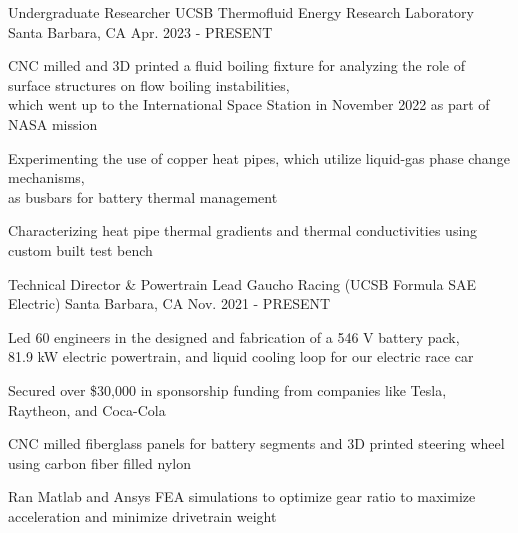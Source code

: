 

\begin{cventries}

\cventry
{Undergraduate Researcher} %
{UCSB Thermofluid Energy Research Laboratory} %
{Santa Barbara, CA} %
{Apr. 2023 - PRESENT} %
{ %
\begin{cvitems}   
\item {CNC milled and 3D printed a fluid boiling fixture for analyzing the role of surface structures on flow boiling instabilities,\\ which went up to the International Space Station in November 2022 as part of NASA mission}
\item {Experimenting the use of copper heat pipes, which utilize liquid-gas phase change mechanisms,\\ as busbars for battery thermal management}
\item {Characterizing heat pipe thermal gradients and thermal conductivities using custom built test bench}
\end{cvitems}
}

\cventry
{Technical Director \& Powertrain Lead} %
{Gaucho Racing (UCSB Formula SAE Electric)} %
{Santa Barbara, CA} %
{Nov. 2021 - PRESENT} %
{ %
\begin{cvitems}   
\item {Led 60 engineers in the designed and fabrication of a 546 V battery pack, \\ 81.9 kW electric powertrain, and liquid cooling loop for our electric race car}
\item {Secured over \$30,000 in sponsorship funding from companies like Tesla, Raytheon, and Coca-Cola}
\item {CNC milled fiberglass panels for battery segments and 3D printed steering wheel using carbon fiber filled nylon}
\item {Ran Matlab and Ansys FEA simulations to optimize gear ratio to maximize acceleration and minimize drivetrain weight}
\end{cvitems}
}


\end{cventries}
